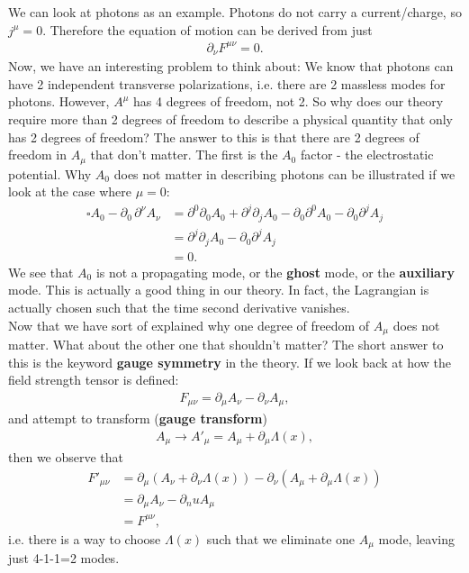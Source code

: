 \documentclass[a4paper,11pt]{article}
\numberwithin{equation}{section}
\theoremstyle{definition}
\begin{document}
We can look at photons as an example. Photons do not carry a current/charge, so $j^\mu = 0$. Therefore the equation of motion can be derived from just
\begin{align*}
\partial_\nu F^{\mu\nu} = 0.
\end{align*}
Now, we have an interesting problem to think about: We know that photons can have 2 independent transverse polarizations, i.e. there are 2 massless modes for photons. However, $A^\mu$ has 4 degrees of freedom, not 2. So why does our theory require more than 2 degrees of freedom to describe a physical quantity that only has 2 degrees of freedom? The answer to this is that there are 2 degrees of freedom in $A_\mu$ that don't matter. The first is the $A_0$ factor - the electrostatic potential. Why $A_0$ does not matter in describing photons can be illustrated if we look at the case where $\mu = 0$:
\begin{align*}
\square A_0 - \partial_0\,\partial^\nu A_\nu 
&= \partial^0\partial_0A_0 + \partial^j\partial_jA_0 - \partial_0\partial^0A_0-\partial_0\partial^jA_j\\ 
&=  \partial^j\partial_jA_0 - \partial_0\partial^jA_j \\
&=  0.
\end{align*} 
We see that $A_0$ is not a propagating mode, or the \textbf{ghost} mode, or the \textbf{auxiliary} mode. This is actually a good thing in our theory. In fact, the Lagrangian is actually chosen such that the time second derivative vanishes. \\

Now that we have sort of explained why one degree of freedom of $A_\mu$ does not matter. What about the other one that shouldn't matter? The short answer to this is the keyword \textbf{gauge symmetry} in the theory. If we look back at how the field strength tensor is defined:
\begin{align*}
F_{\mu\nu} = \partial_\mu A_\nu - \partial_\nu A_\mu,
\end{align*}
and attempt to transform (\textbf{gauge transform})
\begin{align*}
A_\mu \rightarrow A'_\mu = A_\mu + \partial_\mu\Lambda(x),
\end{align*}
then we observe that
\begin{align*}
F'_{\mu\nu} &= \partial_\mu(A_\nu + \partial_\nu\Lambda(x)) - \partial_\nu(A_\mu + \partial_\mu\Lambda(x))\\
 &= \partial_\mu A_\nu - \partial_nu A_\mu \\
 &= F^{\mu\nu},
\end{align*}
i.e. there is a way to choose $\Lambda(x)$ such that we eliminate one $A_\mu$ mode, leaving just 4-1-1=2 modes.\\
\end{document}

